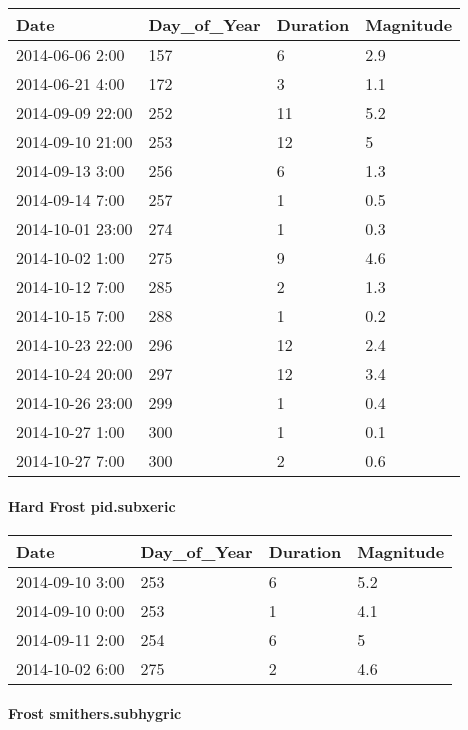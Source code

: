 \documentclass[
]{article}
\begin{document}
\begin{tabular}{l|l|l|l}
\hline
Date & Day\_of\_Year & Duration & Magnitude\\
\hline
2014-06-06 2:00 & 157 & 6 & 2.9\\
\hline
2014-06-21 4:00 & 172 & 3 & 1.1\\
\hline
2014-09-09 22:00 & 252 & 11 & 5.2\\
\hline
2014-09-10 21:00 & 253 & 12 & 5\\
\hline
2014-09-13 3:00 & 256 & 6 & 1.3\\
\hline
2014-09-14 7:00 & 257 & 1 & 0.5\\
\hline
2014-10-01 23:00 & 274 & 1 & 0.3\\
\hline
2014-10-02 1:00 & 275 & 9 & 4.6\\
\hline
2014-10-12 7:00 & 285 & 2 & 1.3\\
\hline
2014-10-15 7:00 & 288 & 1 & 0.2\\
\hline
2014-10-23 22:00 & 296 & 12 & 2.4\\
\hline
2014-10-24 20:00 & 297 & 12 & 3.4\\
\hline
2014-10-26 23:00 & 299 & 1 & 0.4\\
\hline
2014-10-27 1:00 & 300 & 1 & 0.1\\
\hline
2014-10-27 7:00 & 300 & 2 & 0.6\\
\hline
\end{tabular}

\hypertarget{hard-frost-pid.subxeric}{%
\paragraph{Hard Frost pid.subxeric}\label{hard-frost-pid.subxeric}}

\begin{tabular}{l|l|l|l}
\hline
Date & Day\_of\_Year & Duration & Magnitude\\
\hline
2014-09-10 3:00 & 253 & 6 & 5.2\\
\hline
2014-09-10 0:00 & 253 & 1 & 4.1\\
\hline
2014-09-11 2:00 & 254 & 6 & 5\\
\hline
2014-10-02 6:00 & 275 & 2 & 4.6\\
\hline
\end{tabular}

\hypertarget{frost-smithers.subhygric}{%
\paragraph{Frost smithers.subhygric}\label{frost-smithers.subhygric}}
\end{document}
